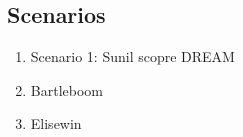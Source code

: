 \subsection{Scenarios}

\begin{enumerate}
\item Scenario 1: Sunil scopre DREAM
\item Bartleboom
\item Elisewin
\end{enumerate}

\newpage